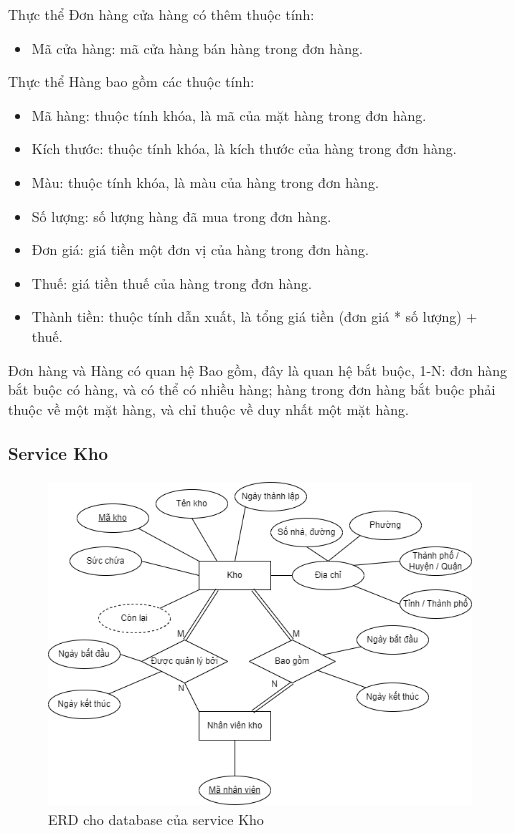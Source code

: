 \par Thực thể Đơn hàng cửa hàng có thêm thuộc tính:
\begin{itemize}
    \item Mã cửa hàng: mã cửa hàng bán hàng trong đơn hàng.
\end{itemize}

\par Thực thể Hàng bao gồm các thuộc tính:
\begin{itemize}
    \item Mã hàng: thuộc tính khóa, là mã của mặt hàng trong đơn hàng.
    \item Kích thước: thuộc tính khóa, là kích thước của hàng trong đơn hàng.
    \item Màu: thuộc tính khóa, là màu của hàng trong đơn hàng.
    \item Số lượng: số lượng hàng đã mua trong đơn hàng.
    \item Đơn giá: giá tiền một đơn vị của hàng trong đơn hàng.
    \item Thuế: giá tiền thuế của hàng trong đơn hàng.
    \item Thành tiền: thuộc tính dẫn xuất, là tổng giá tiền (đơn giá * số lượng) + thuế.
\end{itemize}

\par Đơn hàng và Hàng có quan hệ Bao gồm, đây là quan hệ bắt buộc, 1-N: đơn hàng bắt buộc có hàng, và có thể có nhiều hàng; hàng trong đơn hàng bắt buộc phải thuộc về một mặt hàng, và chỉ thuộc về duy nhất một mặt hàng.

\subsubsection{Service Kho}
\begin{figure}[!htp]
    \begin{center}
        \includegraphics[width=1\textwidth]{img/database/erd/shop_online-Kho.png}
        \newline
        \caption{ERD cho database của service Kho}
    \end{center}
\end{figure}

